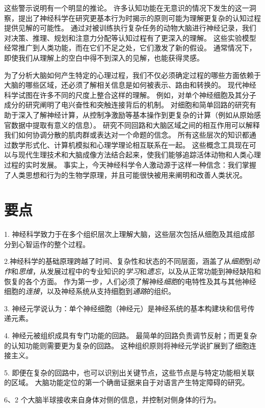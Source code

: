 这些警示说明有一个明显的推论。
许多认知功能在无意识的情况下发生的这一洞察，提出了神经科学在研究更基本行为时揭示的原则可能为理解更复杂的认知过程提供见解的可能性。
通过对被训练执行复杂任务的动物大脑进行神经记录，我们对决策、推理、规划和注意力分配等认知过程有了更深入的理解。
这些实验模型经常推广到人类功能，而在它们不足之处，它们激发了新的假设。
通常情况下，即使我们从理解上的空白中得不到深入的见解，也能获得灵感。


为了分析大脑如何产生特定的心理过程，我们不仅必须确定过程的哪些方面依赖于大脑的哪些区域，还必须了解相关信息是如何被表示、路由和转换的。
现代神经科学试图在许多不同的尺度上整合这样的理解。
例如，对单个神经细胞及其分子成分的研究阐明了电兴奋性和突触连接背后的机制。
对细胞和简单回路的研究有助于深入了解神经计算，从控制净激励等基本操作到更复杂的计算（例如从原始感官数据中提取有意义的信息）。
研究不同回路和大脑区域之间的相互作用可以解释我们如何协调分散的肌肉群或表达对一个命题的信念。
所有这些层次的知识都通过数学形式化、计算机模拟和心理学理论相互联系在一起。
这些概念工具现在可以与现代生理技术和大脑成像方法结合起来，使我们能够追踪活体动物和人类心理过程的实时发展。
事实上，今天神经科学令人激动源于这样一种信念：我们掌握了人类思想和行为的生物学原理，并且可能很快被用来阐明和改善人类状况。






\section{要点}

1. 神经科学致力于在多个组织层次上理解大脑，这些层次包括从细胞及其组成部分到心智运作的整个过程。


2.神经科学的基础原理跨越了时间、复杂性和状态的不同层面，涵盖了从\textit{细胞}到\textit{动作}和\textit{思维}，从发展过程中的专业知识的\textit{学习}和\textit{遗忘}，以及从正常功能到神经缺陷和恢复的各个方面。
作为第一步，人们必须了解神经\textit{细胞}的电特性及其与其他神经细胞的\textit{连接}，以及神经系统从支持细胞到\textit{通路}的组织。


3. 神经元学说认为：单个神经细胞（神经元）是神经系统的基本构建块和信号传递元素。


4. 神经元被组织成具有专门功能的回路。
最简单的回路负责调节反射；而更复杂的认知功能则需要更为复杂的回路。
这种组织原则将神经元学说扩展到了细胞连接主义。


5. 即便在复杂的回路中，也可以识别出关键节点，这些节点是与特定功能相关联的区域。
大脑功能定位的第一个确凿证据来自于对语言产生特定障碍的研究。


6、2 个大脑半球接收来自身体对侧的信息，并控制对侧身体的行为。


